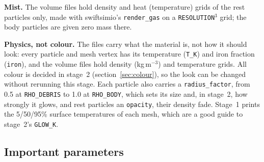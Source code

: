 \documentclass[11pt]{article}
\newcommand{\pc}[1]{\texttt{#1}}
\begin{document}
\textbf{Mist.} The volume files hold density and heat (temperature) grids of the rest particles only, made with swiftsimio's \pc{render\_gas} on a \pc{RESOLUTION}$^3$ grid; the body particles are given zero mass there.
 
\textbf{Physics, not colour.} The files carry what the material is, not how it should look: every particle and mesh vertex has its temperature (\pc{T\_K}) and iron fraction (\pc{iron}), and the volume files hold density (kg\,m$^{-3}$) and temperature grids. All colour is decided in stage~2 (section~\ref{sec:colour}), so the look can be changed without rerunning this stage. Each particle also carries a \pc{radius\_factor}, from 0.5 at \pc{RHO\_DEBRIS} to 1.0 at \pc{RHO\_BODY}, which sets its size and, in stage~2, how strongly it glows, and rest particles an \pc{opacity}, their density fade. Stage~1 prints the 5/50/95\% surface temperatures of each mesh, which are a good guide to stage~2's \pc{GLOW\_K}.
 
\subsection{Important parameters}
 
\end{document}
